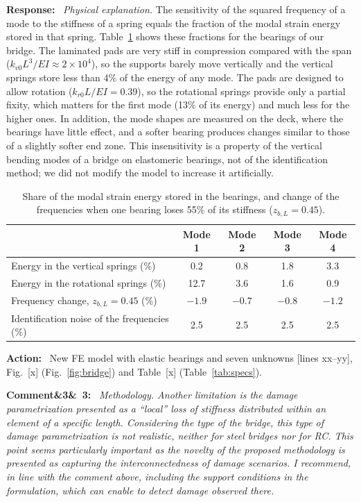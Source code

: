 \documentclass[11pt]{article}
\newenvironment{rcomment}[1]{\par\bigskip\noindent\textbf{Comment\ifx&#1&\else\ #1\fi:}\ \itshape}{\par}
\newenvironment{response}{\par\smallskip\noindent\color{resp}\textbf{Response:}\ }{\par}
\newenvironment{action}{\par\smallskip\noindent\color{resp}\textbf{Action:}\ }{\par}
\newcommand{\tbd}[1]{\textcolor{note}{\textsf{[#1]}}}
\newcommand{\lines}[1]{\tbd{lines #1}}
\begin{document}
\begin{response}
\textit{Physical explanation.} The sensitivity of the squared frequency of a mode to the stiffness of a spring equals
the fraction of the modal strain energy stored in that spring. Table~\ref{tab:bearing_energy} shows these fractions for
the bearings of our bridge. The laminated pads are very stiff in compression compared with the span
($k_{v0}L^3/EI\approx2\times10^4$), so the supports barely move vertically and the vertical springs store less than
4\% of the energy of any mode. The pads are designed to allow rotation ($k_{r0}L/EI=0.39$), so the rotational springs
provide only a partial fixity, which matters for the first mode (13\% of its energy) and much less for the higher ones.
In addition, the mode shapes are measured on the deck, where the bearings have little effect, and a softer bearing
produces changes similar to those of a slightly softer end zone. This insensitivity is a property of the vertical
bending modes of a bridge on elastomeric bearings, not of the identification method; we did not modify the model to
increase it artificially.
\end{response}

\begin{table}[H]
\centering\small
\caption{Share of the modal strain energy stored in the bearings, and change of the frequencies when one bearing loses
55\% of its stiffness ($z_{b,L}=0.45$).}
\label{tab:bearing_energy}
\begin{tabular}{lcccc}
\toprule
 & Mode 1 & Mode 2 & Mode 3 & Mode 4 \\
\midrule
Energy in the vertical springs (\%) & 0.2 & 0.8 & 1.8 & 3.3 \\
Energy in the rotational springs (\%) & 12.7 & 3.6 & 1.6 & 0.9 \\
Frequency change, $z_{b,L}=0.45$ (\%) & $-1.9$ & $-0.7$ & $-0.8$ & $-1.2$ \\
\midrule
Identification noise of the frequencies (\%) & 2.5 & 2.5 & 2.5 & 2.5 \\
\bottomrule
\end{tabular}
\end{table}

\begin{action}
New FE model with elastic bearings and seven unknowns \lines{xx--yy}, Fig.~\tbd{x} (Fig.~\ref{fig:bridge}) and
Table~\tbd{x} (Table~\ref{tab:specs}).
\end{action}

\begin{rcomment}{3}
Methodology. Another limitation is the damage parametrization presented as a ``local'' loss of stiffness distributed
within an element of a specific length. Considering the type of the bridge, this type of damage parametrization is not
realistic, neither for steel bridges nor for RC. This point seems particularly important as the novelty of the proposed
methodology is presented as capturing the interconnectedness of damage scenarios. I recommend, in line with the comment
above, including the support conditions in the formulation, which can enable to detect damage observed there.
\end{rcomment}
\end{document}
